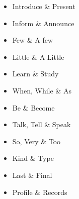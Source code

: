 \begin{multicols*}{2}
\begin{itemize}
        \item Introduce \& Present
        \item Inform \& Announce
        \item Few \& A few
        \item Little \& A Little
        \item Learn \& Study
        \item When, While \& As
        \item Be \& Become
        \item Talk, Tell \& Speak
        \item So, Very \& Too
        \item Kind \& Type
        \item Last \& Final
        \item Profile \& Records        
    \end{itemize}
\end{multicols*}

